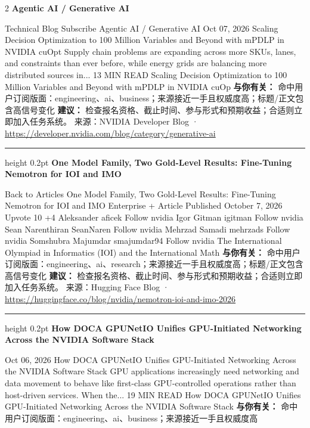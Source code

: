 \documentclass[10.5pt]{ctexart}
\begin{document}
\begin{multicols}{2}
{\large\bfseries Agentic AI / Generative AI}\par
Technical Blog Subscribe Agentic AI / Generative AI Oct 07, 2026 Scaling Decision Optimization to 100 Million Variables and Beyond with mPDLP in NVIDIA cuOpt Supply chain problems are expanding across more SKUs, lanes, and constraints than ever before, while energy grids are balancing more distributed sources in... 13 MIN READ Scaling Decision Optimization to 100 Million Variables and Beyond with mPDLP in NVIDIA cuOp
\textbf{与你有关：} 命中用户订阅版面：engineering、ai、business；来源接近一手且权威度高；标题/正文包含高信号变化
\textbf{建议：} 检查报名资格、截止时间、参与形式和预期收益；合适则立即加入任务系统。
{\footnotesize\color{ormuted} 来源：NVIDIA Developer Blog · \url{https://developer.nvidia.com/blog/category/generative-ai}}
\vspace{2mm}
\hrule height 0.2pt
\vspace{2mm}
{\large\bfseries One Model Family, Two Gold-Level Results: Fine-Tuning Nemotron for IOI and IMO}\par
Back to Articles One Model Family, Two Gold-Level Results: Fine-Tuning Nemotron for IOI and IMO Enterprise + Article Published October 7, 2026 Upvote 10 +4 Aleksander aficek Follow nvidia Igor Gitman igitman Follow nvidia Sean Narenthiran SeanNaren Follow nvidia Mehrzad Samadi mehrzads Follow nvidia Somshubra Majumdar smajumdar94 Follow nvidia The International Olympiad in Informatics (IOI) and the International Math
\textbf{与你有关：} 命中用户订阅版面：engineering、ai、research；来源接近一手且权威度高；标题/正文包含高信号变化
\textbf{建议：} 检查报名资格、截止时间、参与形式和预期收益；合适则立即加入任务系统。
{\footnotesize\color{ormuted} 来源：Hugging Face Blog · \url{https://huggingface.co/blog/nvidia/nemotron-ioi-and-imo-2026}}
\vspace{2mm}
\hrule height 0.2pt
\vspace{2mm}
{\large\bfseries How DOCA GPUNetIO Unifies GPU-Initiated Networking Across the NVIDIA Software Stack}\par
Oct 06, 2026 How DOCA GPUNetIO Unifies GPU-Initiated Networking Across the NVIDIA Software Stack GPU applications increasingly need networking and data movement to behave like first-class GPU-controlled operations rather than host-driven services. When the... 19 MIN READ How DOCA GPUNetIO Unifies GPU-Initiated Networking Across the NVIDIA Software Stack
\textbf{与你有关：} 命中用户订阅版面：engineering、ai、business；来源接近一手且权威度高

\end{multicols}
\end{document}
